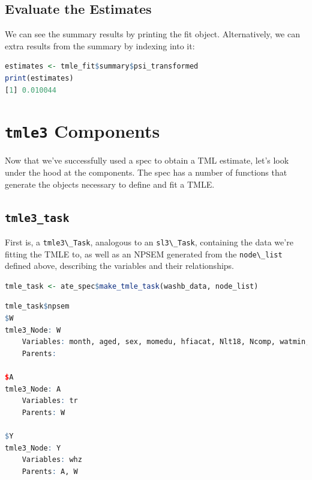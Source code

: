 \documentclass[
  12pt, krantz2,
]{book}
\newcommand{\passthrough}[1]{#1}
\theoremstyle{definition}
\theoremstyle{definition}
\theoremstyle{definition}
\newcommand{\1}{\mathbbm{1}}
\begin{document}
\hypertarget{evaluate-the-estimates}{%
\subsection{Evaluate the Estimates}\label{evaluate-the-estimates}}

We can see the summary results by printing the fit object. Alternatively, we
can extra results from the summary by indexing into it:

\begin{lstlisting}[language=R]
estimates <- tmle_fit$summary$psi_transformed
print(estimates)
[1] 0.010044
\end{lstlisting}

\hypertarget{tmle3-components}{%
\section{\texorpdfstring{\texttt{tmle3} Components}{tmle3 Components}}\label{tmle3-components}}

Now that we've successfully used a spec to obtain a TML estimate, let's look
under the hood at the components. The spec has a number of functions that
generate the objects necessary to define and fit a TMLE.

\hypertarget{tmle3_task}{%
\subsection{\texorpdfstring{\texttt{tmle3\_task}}{tmle3\_task}}\label{tmle3_task}}

First is, a \passthrough{\lstinline!tmle3\_Task!}, analogous to an \passthrough{\lstinline!sl3\_Task!}, containing the data we're
fitting the TMLE to, as well as an NPSEM generated from the \passthrough{\lstinline!node\_list!}
defined above, describing the variables and their relationships.

\begin{lstlisting}[language=R]
tmle_task <- ate_spec$make_tmle_task(washb_data, node_list)
\end{lstlisting}

\begin{lstlisting}[language=R]
tmle_task$npsem
$W
tmle3_Node: W
    Variables: month, aged, sex, momedu, hfiacat, Nlt18, Ncomp, watmin, elec, floor, walls, roof, asset_wardrobe, asset_table, asset_chair, asset_khat, asset_chouki, asset_tv, asset_refrig, asset_bike, asset_moto, asset_sewmach, asset_mobile, momage, momheight, delta_momage, delta_momheight
    Parents: 

$A
tmle3_Node: A
    Variables: tr
    Parents: W

$Y
tmle3_Node: Y
    Variables: whz
    Parents: A, W
\end{lstlisting}
\end{document}
